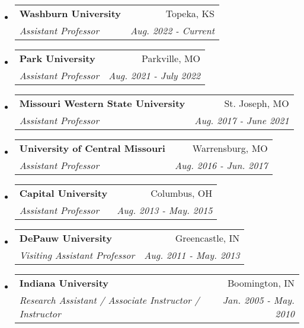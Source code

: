 \documentclass[letterpaper,11pt]{article}
\makeatletter
\newcommand{\resitem}[1]{\item #1 \vspace{-2pt}}
\newcommand{\ressubheading}[4]{
\begin{tabular*}{6.5in}{l@{\cftdotfill{\cftsecdotsep}\extracolsep{\fill}}r}
		\textbf{#1} & #2 \\
		\textit{#3} & \textit{#4} \\
\end{tabular*}\vspace{-6pt}}
\makeatother
\begin{document}
\begin{itemize}
\item
	\ressubheading{Washburn University}{Topeka, KS}{Assistant Professor}{Aug. 2022 - Current}
\item
	\ressubheading{Park University}{Parkville, MO}{Assistant Professor}{Aug. 2021 - July 2022}
\item
	\ressubheading{Missouri Western State University}{St. Joseph, MO}{Assistant Professor}{Aug. 2017 - June 2021}
\item
	\ressubheading{University of Central Missouri}{Warrensburg, MO}{Assistant Professor}{Aug. 2016 - Jun. 2017}
\item
	\ressubheading{Capital University}{Columbus, OH}{Assistant Professor}{Aug. 2013 - May. 2015}
\item
	\ressubheading{DePauw University}{Greencastle, IN}{Visiting Assistant Professor}{Aug. 2011 - May. 2013}
\item
	\ressubheading{Indiana University}{Boomington, IN}{Research Assistant / Associate Instructor / Instructor }{Jan. 2005 - May. 2010}

\end{itemize}
\end{document}
